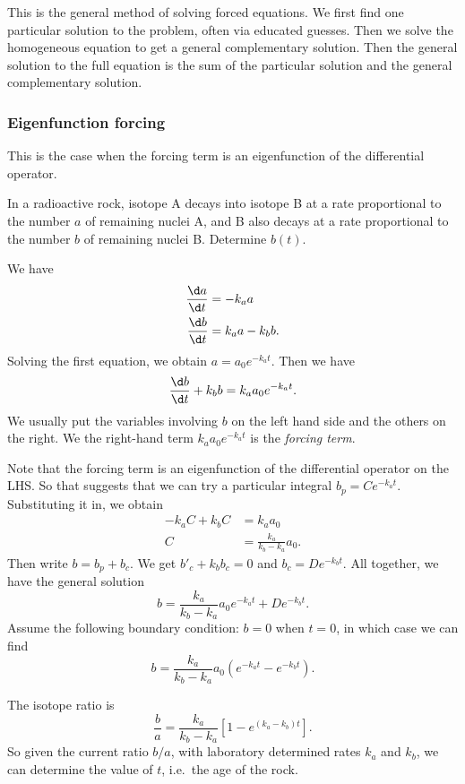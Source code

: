 \documentclass[a4paper]{article}
\begin{document}
This is the general method of solving forced equations. We first find one particular solution to the problem, often via educated guesses. Then we solve the homogeneous equation to get a general complementary solution. Then the general solution to the full equation is the sum of the particular solution and the general complementary solution.

\subsubsection{Eigenfunction forcing}
This is the case when the forcing term is an eigenfunction of the differential operator.
\begin{eg}
  In a radioactive rock, isotope A decays into isotope B at a rate proportional to the number $a$ of remaining nuclei A, and B also decays at a rate proportional to the number $b$ of remaining nuclei B. Determine $b(t)$.

  We have
  \begin{align*}
    \frac{\d a}{\d t} &= -k_a a\\
    \frac{\d b}{\d t} &= k_a a - k_b b.
  \end{align*}
  Solving the first equation, we obtain $a = a_0e^{-k_at}$. Then we have
  \[
    \frac{\d b}{\d t} + k_b b = k_aa_0e^{-k_at}.
  \]
  We usually put the variables involving $b$ on the left hand side and the others on the right. We the right-hand term $k_aa_0e^{-k_at}$ is the \emph{forcing term}.

  Note that the forcing term is an eigenfunction of the differential operator on the LHS. So that suggests that we can try a particular integral $b_p = Ce^{-k_at}$. Substituting it in, we obtain
  \begin{align*}
    -k_aC + k_bC &= k_a a_0\\
    C &= \frac{k_a}{k_b - k_a}a_0.
  \end{align*}
  Then write $b = b_p + b_c$. We get $b'_c + k_bb_c = 0$ and $b_c = De^{-k_bt}$. All together, we have the general solution
  \[
    b = \frac{k_a}{k_b - k_a}a_0 e^{-k_at} + De^{-k_bt}.
  \]
  Assume the following boundary condition: $b = 0$ when $t = 0$, in which case we can find
  \[
    b = \frac{k_a}{k_b - k_a}a_0\left(e^{-k_at} - e^{-k_bt}\right).
  \]
  \begin{center}
  \end{center}
  The isotope ratio is
  \[
    \frac{b}{a} = \frac{k_a}{k_b - k_a}\left[1 - e^{(k_a - k_b)t}\right].
  \]
  So given the current ratio $b/a$, with laboratory determined rates $k_a$ and $k_b$, we can determine the value of $t$, i.e.\ the age of the rock.
\end{eg}
\end{document}
